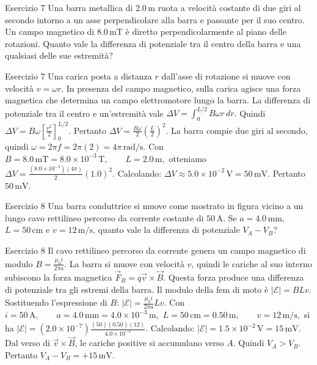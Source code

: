 \documentclass[a4paper]{article}
\begin{document}
\begin{snippetexercise}{Esercizio 7}
    Una barra metallica di \(2.0\,\mathrm{m}\) ruota a velocità costante di
    due giri al secondo intorno a un asse perpendicolare alla barra e passante
    per il suo centro. Un campo magnetico di \(8.0\,\mathrm{mT}\) è diretto
    perpendicolarmente al piano delle rotazioni. Quanto vale la differenza di
    potenziale tra il centro della barra e una qualsiasi delle sue estremità?

\end{snippetexercise}
\begin{snippetsolution}{Esercizio 7}
    Una carica posta a distanza \(r\) dall'asse di rotazione si muove con
    velocità
    \(v = \omega r.\)
    In presenza del campo magnetico, sulla carica agisce una forza magnetica
    che determina un campo elettromotore lungo la barra. La differenza di
    potenziale tra il centro e un'estremità vale
    \(\Delta V = \int_0^{L/2} B\omega r\,dr.\)
    Quindi
    \(\Delta V = B\omega \left[ \frac{r^2}{2} \right]_0^{L/2}.\)
    Pertanto
    \(\Delta V = \frac{B\omega}{2} \left( \frac{L}{2} \right)^2.\)
    La barra compie due giri al secondo, quindi
    \(\omega = 2\pi f = 2\pi(2)=4\pi\,\mathrm{rad/s}.\)
    Con
    \(B = 8.0\,\mathrm{mT} = 8.0 \times 10^{-3}\,\mathrm{T}, \qquad L = 2.0\,\mathrm{m},\)
    otteniamo
    \(\Delta V = \frac{ \left(8.0 \times 10^{-3}\right)(4\pi) }{2} (1.0)^2.\)
    Calcolando:
    \(\Delta V \approx 5.0 \times 10^{-2}\,\mathrm{V} = 50\,\mathrm{mV}.\)
    Pertanto
    \(\boxed{50\,\mathrm{mV}}.\)
\end{snippetsolution}
\begin{snippetexercise}{Esercizio 8}
    Una barra conduttrice si muove come mostrato in figura vicino a un lungo
    cavo rettilineo percorso da corrente costante di \(50\,\mathrm{A}\).
    Se \(a = 4.0\,\mathrm{mm}\), \(L = 50\,\mathrm{cm}\) e
    \(v = 12\,\mathrm{m/s}\), quanto vale la differenza di potenziale
    \(V_A - V_B\)?

\end{snippetexercise}
\begin{snippetsolution}{Esercizio 8}
    Il cavo rettilineo percorso da corrente genera un campo magnetico di modulo
    \(B = \frac{\mu_0 i}{2\pi a}.\)
    La barra si muove con velocità \(v\), quindi le cariche al suo interno
    subiscono la forza magnetica
    \(\vec{F}_B = q\vec{v}\times\vec{B}.\)
    Questa forza produce una differenza di potenziale tra gli estremi della
    barra. Il modulo della fem di moto è
    \(|\mathcal{E}| = BLv.\)
    Sostituendo l'espressione di \(B\):
    \(|\mathcal{E}| = \frac{\mu_0 i}{2\pi a}Lv.\)
    Con
    \(i = 50\,\mathrm{A}, \qquad a = 4.0\,\mathrm{mm}=4.0 \times 10^{-3}\,\mathrm{m},\)
    \(L = 50\,\mathrm{cm}=0.50\,\mathrm{m}, \qquad v = 12\,\mathrm{m/s},\)
    si ha
    \(|\mathcal{E}| = \left(2.0 \times 10^{-7}\right) \frac{(50)(0.50)(12)}{4.0 \times 10^{-3}}.\)
    Calcolando:
    \(|\mathcal{E}| = 1.5 \times 10^{-2}\,\mathrm{V} = 15\,\mathrm{mV}.\)
    Dal verso di \(\vec{v}\times\vec{B}\), le cariche positive si accumulano
    verso \(A\). Quindi
    \(V_A > V_B.\)
    Pertanto
    \(\boxed{V_A - V_B = +15\,\mathrm{mV}}.\)
\end{snippetsolution}
\end{document}
